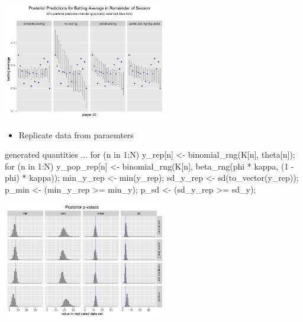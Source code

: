 \documentclass[10pt]{report}
\begin{document}
\begin{center}
\includegraphics[height=2in]{img/posterior-predictions.png}
\end{center}


%
\begin{itemize}
\item Replicate data from paraemters
\end{itemize}
\begin{stancode}
generated quantities {
  ...
  for (n in 1:N)
    y_rep[n] <- binomial_rng(K[n], theta[n]);
  for (n in 1:N)
    y_pop_rep[n] <- binomial_rng(K[n],
                                 beta_rng(phi * kappa,
                                          (1 - phi) * kappa));
  min_y_rep <- min(y_rep);
  sd_y_rep <- sd(to_vector(y_rep));
  p_min <- (min_y_rep >= min_y);
  p_sd <- (sd_y_rep >= sd_y);
}
\end{stancode}

\begin{center}
\includegraphics[height=2in]{img/posterior-p-values.png}
\end{center}
\end{document}
